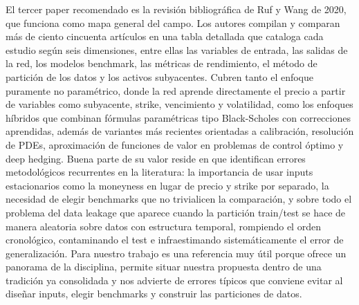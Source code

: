 \documentclass[11pt,a4paper]{article}
\begin{document}
El tercer paper recomendado es la revisión bibliográfica de Ruf y Wang de 2020, que funciona como mapa general del campo. Los autores compilan y comparan más de ciento cincuenta artículos en una tabla detallada que cataloga cada estudio según seis dimensiones, entre ellas las variables de entrada, las salidas de la red, los modelos benchmark, las métricas de rendimiento, el método de partición de los datos y los activos subyacentes. Cubren tanto el enfoque puramente no paramétrico, donde la red aprende directamente el precio a partir de variables como subyacente, strike, vencimiento y volatilidad, como los enfoques híbridos que combinan fórmulas paramétricas tipo Black-Scholes con correcciones aprendidas, además de variantes más recientes orientadas a calibración, resolución de PDEs, aproximación de funciones de valor en problemas de control óptimo y deep hedging. Buena parte de su valor reside en que identifican errores metodológicos recurrentes en la literatura: la importancia de usar inputs estacionarios como la moneyness en lugar de precio y strike por separado, la necesidad de elegir benchmarks que no trivialicen la comparación, y sobre todo el problema del data leakage que aparece cuando la partición train/test se hace de manera aleatoria sobre datos con estructura temporal, rompiendo el orden cronológico, contaminando el test e infraestimando sistemáticamente el error de generalización. Para nuestro trabajo es una referencia muy útil porque ofrece un panorama de la disciplina, permite situar nuestra propuesta dentro de una tradición ya consolidada y nos advierte de errores típicos que conviene evitar al diseñar inputs, elegir benchmarks y construir las particiones de datos.
\end{document}
